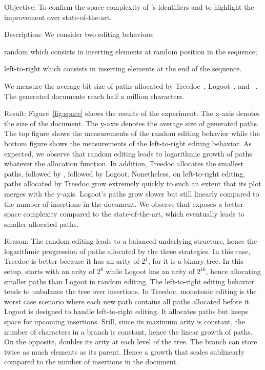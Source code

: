 \begin{asparadesc}
\item [Objective:] To confirm the space complexity of \LSEQ's identifiers and to
  highlight the improvement over state-of-the-art.
\item [Description:] We consider two editing behaviors:
  \begin{inparaenum}[(i)]
  \item random which consists in inserting elements at random position in the sequence;
  \item left-to-right which consists in inserting elements at the end of the
    sequence.
  \end{inparaenum} We measure the average bit size of paths allocated by
  Treedoc~\cite{preguica2009commutative}, Logoot~\cite{weiss2009logoot}, and
  \LSEQ~\cite{nedelec2013lseq}. The generated documents reach half a million
  characters.
\item [Result:] Figure~\ref{fig:space} shows the results of the experiment. The
  x-axis denotes the size of the document. The y-axis denotes the average size
  of generated paths. The top figure shows the measurements of the random
  editing behavior while the bottom figure shows the measurements of the
  left-to-right editing behavior. As expected, we observe that random editing
  leads to logarithmic growth of paths whatever the allocation function. In
  addition, Treedoc allocates the smallest paths, followed by \LSEQ, followed by
  Logoot. Nonetheless, on left-to-right editing, paths allocated by Treedoc grow
  extremely quickly to such an extent that its plot merges with the
  y-axis. Logoot's paths grow slower but still linearly compared to the number
  of insertions in the document. We observe that \LSEQ exposes a better space
  complexity compared to the state-of-the-art, which eventually leads to smaller
  allocated paths.
\item [Reason:] The random editing leads to a balanced underlying structure,
  hence the logarithmic progression of paths allocated by the three
  strategies. In this case, Treedoc is better because it has an arity of $2^1$,
  for it is a binary tree. In this setup, \LSEQ starts with an arity of $2^8$
  while Logoot has an arity of $2^{16}$, hence \LSEQ allocating smaller paths than
  Logoot in random editing. The left-to-right editing behavior tends to
  unbalance the tree over insertions. In Treedoc, monotonic editing is the worst
  case scenario where each new path contains all paths allocated before
  it. Logoot is designed to handle left-to-right editing. It allocates paths but
  keeps space for upcoming insertions. Still, since its maximum arity is
  constant, the number of characters in a branch is constant, hence the linear
  growth of paths. On the opposite, \LSEQ doubles its arity at each level of the
  tree. The branch can store twice as much elements as its parent. Hence a
  growth that scales sublinearly compared to the number of insertions in the
  document.
\end{asparadesc}

